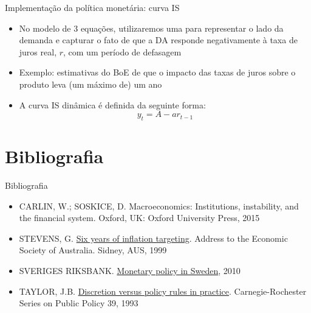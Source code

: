 \documentclass[10pt]{beamer}
\begin{document}
\begin{frame}
    {Implementação da política monetária: curva IS}
    \begin{itemize}
        \item No modelo de 3 equações, utilizaremos uma  para representar o lado da demanda e capturar o fato de que a DA responde negativamente à taxa de juros real, $r$, com um período de defasagem\bigskip
        \item Exemplo: estimativas do BoE de que o impacto das taxas de juros sobre o produto leva (um máximo de) um ano\bigskip
        \item A curva IS dinâmica é definida da seguinte forma:
        \begin{equation}
            y_t = A - ar_{t-1}
        \end{equation}
    \end{itemize}
\end{frame}

\section{Bibliografia}
\begin{frame}{ Bibliografia}
    \begin{itemize}                        
        \item CARLIN, W.; SOSKICE, D. Macroeconomics: Institutions, instability, and the financial system. Oxford, UK: Oxford University Press, 2015\medskip             
        \item STEVENS, G. \href{https://www.rba.gov.au/speeches/1999/sp-ag-200499.html}{Six years of inflation targeting}. Address to the Economic Society of Australia. Sidney, AUS, 1999\medskip
        \item SVERIGES RIKSBANK. \href{https://archive.riksbank.se/en/Web-archive/Published/Press-Releases/2010/Monetary-Policy-in-Sweden/index.html\#:~:text=Monetary\%20Policy\%20in\%20Sweden\%20Date03\%2F06\%2F2010\%20The\%20document\%20\%22Monetary,from\%20the\%20specification\%20of\%20the\%20monetary\%20policy\%20objective}{Monetary policy in Sweden}, 2010\medskip
        \item TAYLOR, J.B. \href{https://web.stanford.edu/~johntayl/Onlinepaperscombinedbyyear/1993/Discretion_versus_Policy_Rules_in_Practice.pdf}{Discretion versus policy rules in practice}. Carnegie-Rochester Series on Public Policy 39, 1993       
    \end{itemize}
\end{frame}
\end{document}
